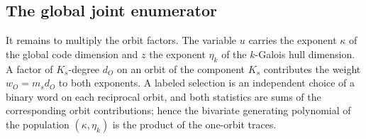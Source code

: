 \documentclass[10pt,a4paper]{article}
\numberwithin{equation}{section}
\theoremstyle{plain}
\theoremstyle{definition}
\theoremstyle{remark}
\begin{document}
\subsection{The global joint enumerator}\label{sec:global}

It remains to multiply the orbit factors. The variable $u$ carries the exponent
$\kappa$ of the global code dimension and $z$ the exponent $\eta_k$ of the
$k$-Galois hull dimension. A factor of $K_s$-degree $d_O$ on an orbit of the
component $K_s$ contributes the weight $w_O=m_sd_O$ to both exponents. A labeled
selection is an independent choice of a binary word on each reciprocal orbit,
and both statistics are sums of the corresponding orbit contributions; hence the
bivariate generating polynomial of the population $(\kappa,\eta_k)$ is the
product of the one-orbit traces.
\end{document}
